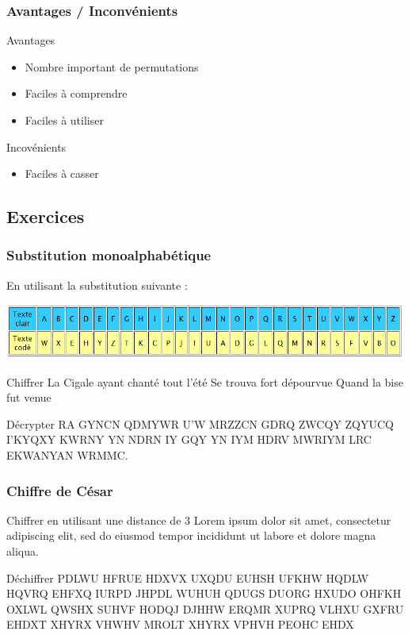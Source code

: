 \documentclass[xcolor={dvipsnames}]{beamer}
\begin{document}
\begin{frame}
\frametitle{Avantages / Inconvénients}

\begin{exampleblock}{Avantages}
	\begin{itemize}
		\item Nombre important de permutations
		\item Faciles à comprendre
		\item Faciles à utiliser
	\end{itemize}
\end{exampleblock}

\begin{alertblock}{Incovénients}
	\begin{itemize}
		\item Faciles à casser
	\end{itemize}
\end{alertblock}
\end{frame}

\subsection{Exercices}
\begin{frame}
	\frametitle{Substitution monoalphabétique}	
	
	En utilisant la substitution suivante :
	\begin{center}
		\includegraphics[scale=0.5]{subst}
	\end{center}
	
	\begin{block}{Chiffrer}
		La Cigale ayant chanté tout l'été
		Se trouva fort dépourvue
		Quand la bise fut venue
	\end{block}
	
	\begin{block}{Décrypter}
		RA GYNCN QDMYWR U'W MRZZCN GDRQ ZWCQY ZQYUCQ I'KYQXY KWRNY YN NDRN IY GQY YN IYM HDRV MWRIYM LRC EKWANYAN WRMMC.
	\end{block}
\end{frame}

\begin{frame}
	\frametitle{Chiffre de César}	
	
	\begin{block}{Chiffrer en utilisant une distance de 3}
		Lorem ipsum dolor sit amet, consectetur adipiscing elit, sed do eiusmod tempor incididunt ut labore et dolore magna aliqua. 
	\end{block}
	
	\begin{block}{Déchiffrer}
		PDLWU HFRUE HDXVX UXQDU EUHSH UFKHW HQDLW HQVRQ EHFXQ IURPD JHPDL WUHUH QDUGS DUORG HXUDO OHFKH OXLWL QWSHX SUHVF HODQJ DJHHW ERQMR XUPRQ VLHXU GXFRU EHDXT XHYRX VHWHV MROLT XHYRX VPHVH PEOHC EHDX
	\end{block}
\end{frame}
\end{document}
